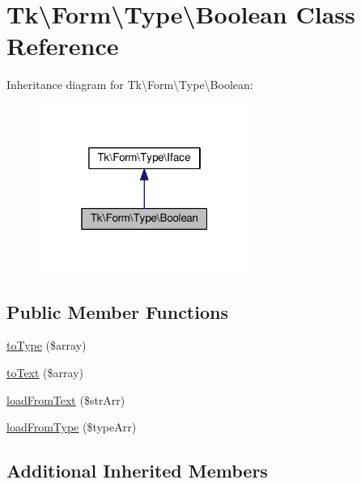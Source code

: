 \hypertarget{classTk_1_1Form_1_1Type_1_1Boolean}{\section{Tk\textbackslash{}Form\textbackslash{}Type\textbackslash{}Boolean Class Reference}
\label{classTk_1_1Form_1_1Type_1_1Boolean}
}


Inheritance diagram for Tk\textbackslash{}Form\textbackslash{}Type\textbackslash{}Boolean\+:\nopagebreak
\begin{figure}[H]
\begin{center}
\leavevmode
\includegraphics[width=196pt]{classTk_1_1Form_1_1Type_1_1Boolean__inherit__graph}
\end{center}
\end{figure}
\subsection*{Public Member Functions}
\begin{DoxyCompactItemize}
\item 
\hyperlink{classTk_1_1Form_1_1Type_1_1Boolean_a96ea72276998c8698afe1e14b2a5481d}{to\+Type} (\$array)
\item 
\hyperlink{classTk_1_1Form_1_1Type_1_1Boolean_a9e9176a54fcce8ba225024f737caf8f5}{to\+Text} (\$array)
\item 
\hyperlink{classTk_1_1Form_1_1Type_1_1Boolean_a9ed008bc01b1fa5a7d4442fd08b67569}{load\+From\+Text} (\$str\+Arr)
\item 
\hyperlink{classTk_1_1Form_1_1Type_1_1Boolean_af68085ba04d1deacc0c3128533d0b73a}{load\+From\+Type} (\$type\+Arr)
\end{DoxyCompactItemize}
\subsection*{Additional Inherited Members}


